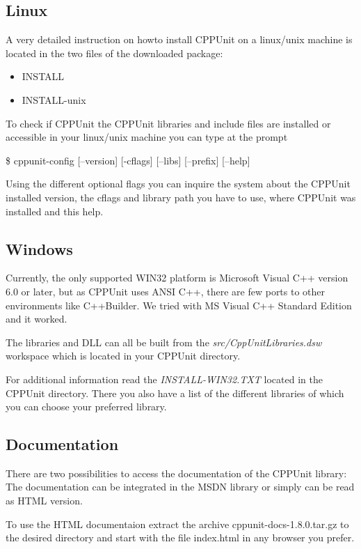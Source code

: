 \subsection{Linux}

A very detailed instruction on howto install CPPUnit on a
linux/unix machine is located in the two files of the downloaded
package:
\begin{itemize}
\item INSTALL
\item INSTALL-unix
\end{itemize}


To check if CPPUnit the CPPUnit libraries and include files are
installed or accessible in your linux/unix machine you can type at
the prompt
\begin{center}
\$ cppunit-config [--version] [-cflags] [--libs] [--prefix]
[--help]
\end{center}
Using the different optional flags you can inquire the system
about the CPPUnit installed version, the cflags and library path
you have to use, where CPPUnit was installed and this help.

\subsection{Windows}

Currently, the only supported WIN32 platform is Microsoft Visual
C++ version 6.0 or later, but as CPPUnit uses ANSI C++, there are
few ports to other environments like C++Builder. We tried with MS
Visual C++ Standard Edition and it worked.

The libraries and DLL can all be built from the
\textit{src/CppUnitLibraries.dsw} workspace which is located in your CPPUnit directory.

For additional information read the
\textit{INSTALL-WIN32.TXT} located in the CPPUnit directory. There you also have
a list of the different libraries of which you can choose your
preferred library.

\subsection{Documentation}
There are two possibilities to access the documentation of the CPPUnit library:
The documentation can be integrated in the MSDN library or simply can be read as
HTML version.

To use the HTML documentaion extract the archive cppunit-docs-1.8.0.tar.gz to
the desired directory and start with the file index.html in any browser you prefer.

